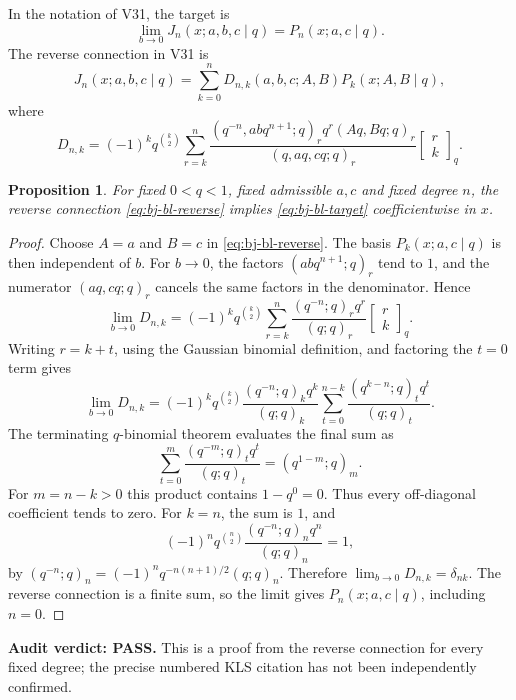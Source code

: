 \documentclass[11pt]{article}
\newtheorem{proposition}{Proposition}
\begin{document}
In the notation of V31, the target is
\begin{equation}\label{eq:bj-bl-target}
 \lim_{b\to0}J_n(x;a,b,c\mid q)=P_n(x;a,c\mid q).
\end{equation}
The reverse connection in V31 is
\begin{equation}\label{eq:bj-bl-reverse}
J_n(x;a,b,c\mid q)=\sum_{k=0}^n D_{n,k}(a,b,c;A,B)P_k(x;A,B\mid q),
\end{equation}
where
\begin{equation}\label{eq:bj-bl-coeff}
D_{n,k}=(-1)^kq^{\binom{k}{2}}\sum_{r=k}^n
 \frac{(q^{-n},abq^{n+1};q)_r q^r(Aq,Bq;q)_r}
 {(q,aq,cq;q)_r}\begin{bmatrix}r\\k\end{bmatrix}_q.
\end{equation}
\begin{proposition}
For fixed $0<q<1$, fixed admissible $a,c$ and fixed degree $n$, the reverse connection \eqref{eq:bj-bl-reverse} implies \eqref{eq:bj-bl-target} coefficientwise in $x$.
\end{proposition}
\begin{proof}
Choose $A=a$ and $B=c$ in \eqref{eq:bj-bl-reverse}. The basis $P_k(x;a,c\mid q)$ is then independent of $b$. For $b\to0$, the factors $(abq^{n+1};q)_r$ tend to $1$, and the numerator $(aq,cq;q)_r$ cancels the same factors in the denominator. Hence
\[
\lim_{b\to0}D_{n,k}=(-1)^kq^{\binom{k}{2}}
\sum_{r=k}^n\frac{(q^{-n};q)_r q^r}{(q;q)_r}
\begin{bmatrix}r\\k\end{bmatrix}_q.
\]
Writing $r=k+t$, using the Gaussian binomial definition, and factoring the $t=0$ term gives
\[
\lim_{b\to0}D_{n,k}=
(-1)^kq^{\binom{k}{2}}
\frac{(q^{-n};q)_kq^k}{(q;q)_k}
\sum_{t=0}^{n-k}\frac{(q^{k-n};q)_t q^t}{(q;q)_t}.
\]
The terminating $q$-binomial theorem evaluates the final sum as
\[
\sum_{t=0}^{m}\frac{(q^{-m};q)_t q^t}{(q;q)_t}
=(q^{1-m};q)_m.
\]
For $m=n-k>0$ this product contains $1-q^0=0$. Thus every off-diagonal coefficient tends to zero. For $k=n$, the sum is $1$, and
\[
(-1)^nq^{\binom n2}\frac{(q^{-n};q)_nq^n}{(q;q)_n}=1,
\]
by $(q^{-n};q)_n=(-1)^nq^{-n(n+1)/2}(q;q)_n$.
Therefore $\lim_{b\to0}D_{n,k}=\delta_{nk}$. The reverse connection is a finite sum, so the limit gives $P_n(x;a,c\mid q)$, including $n=0$.
\end{proof}
\noindent\textbf{Audit verdict: PASS.} This is a proof from the reverse connection for every fixed degree; the precise numbered KLS citation has not been independently confirmed.
\end{document}
